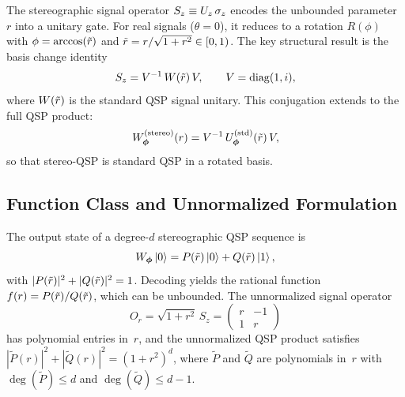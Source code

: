 The stereographic signal operator
$S_z \equiv U_z\,\sigma_z$ encodes the unbounded parameter
$r$ into a unitary gate.  For real signals ($\theta = 0$), it
reduces to a rotation $R(\phi)$ with $\phi = \arccos(\tilde{r})$
and $\tilde{r} = r/\sqrt{1+r^2} \in [0,1)$.  The key structural
result is the basis change identity
\begin{equation}
	S_z = V^{-1}\,W(\tilde{r})\,V, \qquad V = \mathrm{diag}(1,i),
	\label{eq:basis-change}
\end{equation}
where $W(\tilde{r})$ is the standard QSP signal unitary.  This
conjugation extends to the full QSP product:
\begin{equation}
	W_{\bm{\phi}}^{(\mathrm{stereo})}(r)
	= V^{-1}\,U_{\bm{\phi}}^{(\mathrm{std})}(\tilde{r})\,V,
	\label{eq:full-basis-change}
\end{equation}
so that stereo-QSP is standard QSP in a rotated basis.

\subsection{Function Class and Unnormalized Formulation}
\label{subsec:review-function-class}

The output state of a degree-$d$ stereographic QSP sequence is
\begin{equation}
	W_{\bm{\phi}}\ket{0} = P(\tilde{r})\ket{0} + Q(\tilde{r})\ket{1},
	\label{eq:qsp-state}
\end{equation}
with $|P(\tilde{r})|^2 + |Q(\tilde{r})|^2 = 1$.  Decoding yields
the rational function $f(r) = P(\tilde{r})/Q(\tilde{r})$, which can
be unbounded.  The unnormalized signal operator
\begin{equation}
	O_r = \sqrt{1+r^2}\,S_z
	= \begin{pmatrix} r & -1 \\ 1 & r \end{pmatrix}
	\label{eq:unnormalized-signal}
\end{equation}
has polynomial entries in~$r$, and the unnormalized QSP product
satisfies $|\tilde{P}(r)|^2 + |\tilde{Q}(r)|^2 = (1+r^2)^d$,
where $\tilde{P}$ and $\tilde{Q}$ are polynomials in~$r$ with
$\deg(\tilde{P}) \leq d$ and $\deg(\tilde{Q}) \leq d-1$.
